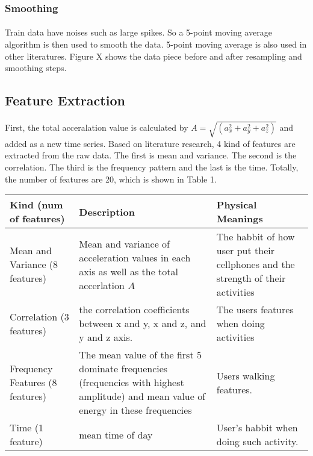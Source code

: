 \documentclass{article}
\begin{document}
		\subsubsection{Smoothing}
		\paragraph{} Train data have noises such as large spikes. So a 5-point moving average algorithm is then used to smooth the data. 5-point moving average is also used in other literatures. Figure X shows the data piece before and after resampling and smoothing steps. 
	
		\subsection{Feature Extraction} %
		\label{sub:feature_extraction}
		
		\paragraph{}First, the total acceralation value is calculated by $A=\sqrt{(a_x^2+a_y^2+a_z^2)}$ and added as a new time series. Based on literature research, 4 kind of features are extracted from the raw data. The first is mean and variance. The second is the correlation. The third is the frequency pattern and the last is the time. Totally, the number of features are 20, which is shown in Table 1. 
		\begin{table}
			\centering
			\begin{tabular}{p{3cm}|p{6cm}|p{4cm}}
			Kind (num of features) & Description & Physical Meanings \\ \hline
			Mean and Variance (8 features) & Mean and variance of acceleration values in each axis as well as the total accerlation $A$ & The habbit of how user put their cellphones and the strength of their activities \\ \hline
			Correlation (3 features) & the correlation coefficients between x and y, x and z, and y and z axis. & The users features when doing activities \\ \hline
			Frequency Features (8 features) & The mean value of the first 5 dominate frequencies (frequencies with highest amplitude) and mean value of energy in these frequencies & Users walking features.\\ \hline
			Time (1 feature) & mean time of day & User's habbit when doing such activity.
			\end{tabular}
		\end{table}
\end{document}
